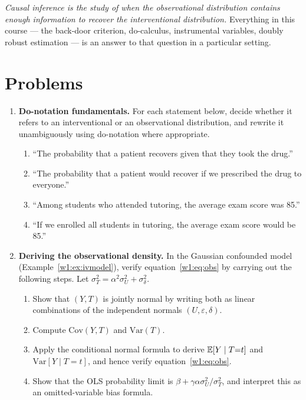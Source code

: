 \documentclass[master.tex]{subfiles}
\begin{document}
\medskip
\noindent\textit{Causal inference is the study of when the observational
distribution contains enough information to recover the interventional
distribution.}  Everything in this course --- the back-door criterion,
do-calculus, instrumental variables, doubly robust estimation --- is an
answer to that question in a particular setting.


\section*{Problems}

\begin{enumerate}[label=\textbf{\arabic*.}, leftmargin=*, itemsep=10pt]

  \item \textbf{Do-notation fundamentals.}
  For each statement below, decide whether it refers to an interventional
  or an observational distribution, and rewrite it unambiguously using
  do-notation where appropriate.
  \begin{enumerate}[label=(\alph*)]
    \item ``The probability that a patient recovers given that they took the drug.''
    \item ``The probability that a patient would recover if we prescribed
          the drug to everyone.''
    \item ``Among students who attended tutoring, the average exam score
          was 85.''
    \item ``If we enrolled all students in tutoring, the average exam score
          would be 85.''
  \end{enumerate}

  \item \textbf{Deriving the observational density.}
  In the Gaussian confounded model (Example~\ref{w1:ex:ivmodel}), verify
  equation~\eqref{w1:eq:obs} by carrying out the following steps.
  Let $\sigma_T^2 = \alpha^2\sigma_U^2 + \sigma_\delta^2$.
  \begin{enumerate}[label=(\alph*)]
    \item Show that $(Y, T)$ is jointly normal by writing both as linear
          combinations of the independent normals $(U, \varepsilon, \delta)$.
    \item Compute $\mathrm{Cov}(Y, T)$ and $\mathrm{Var}(T)$.
    \item Apply the conditional normal formula to derive
          $\mathbb{E}[Y \mid T{=}t]$ and $\mathrm{Var}[Y \mid T{=}t]$,
          and hence verify equation~\eqref{w1:eq:obs}.
    \item Show that the OLS probability limit is
          $\beta + \gamma\alpha\sigma_U^2/\sigma_T^2$, and interpret
          this as an omitted-variable bias formula.
  \end{enumerate}


\end{enumerate}
\end{document}
